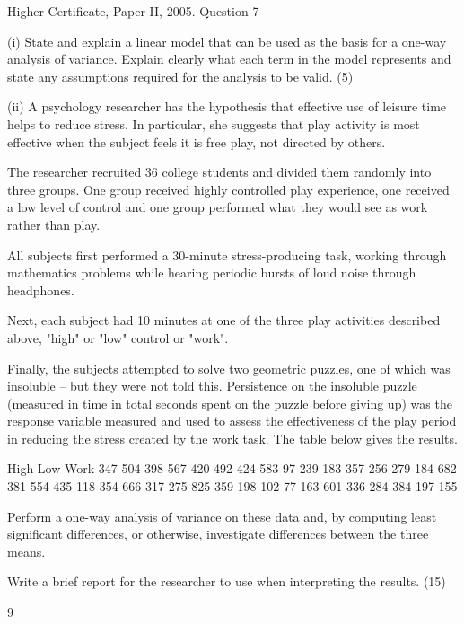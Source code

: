 \documentclass[a4paper,12pt]{article}
\begin{document}
Higher Certificate, Paper II, 2005. Question 7
\begin{framed}
 (i) State and explain a linear model that can be used as the basis for a one-way analysis of variance.  Explain clearly what each term in the model represents and state any assumptions required for the analysis to be valid. (5) 

\end{framed}

\begin{framed}
 (ii) A psychology researcher has the hypothesis that effective use of leisure time helps to reduce stress.  In particular, she suggests that play activity is most effective when the subject feels it is free play, not directed by others. 
 
The researcher recruited 36 college students and divided them randomly into three groups.  One group received highly controlled play experience, one received a low level of control and one group performed what they would see as work rather than play. 
 
All subjects first performed a 30-minute stress-producing task, working through mathematics problems while hearing periodic bursts of loud noise through headphones. 
 
Next, each subject had 10 minutes at one of the three play activities described above, "high" or "low" control or "work". 
 
Finally, the subjects attempted to solve two geometric puzzles, one of which was insoluble – but they were not told this.  Persistence on the insoluble puzzle (measured in time in total seconds spent on the puzzle before giving up) was the response variable measured and used to assess the effectiveness of the play period in reducing the stress created by the work task.  The table below gives the results. 
 
High Low Work 347 504 398 567 420 492 424 583   97 239 183 357 256 279 184 682 381 554 435 118 354 666 317 275 825 359 198 102   77 163 601 336 284 384 197 155 
 
 
Perform a one-way analysis of variance on these data and, by computing least significant differences, or otherwise, investigate differences between the three means. 
 
Write a brief report for the researcher to use when interpreting the results. 
(15) 
 

 
9 
\end{framed}
\end{document}
